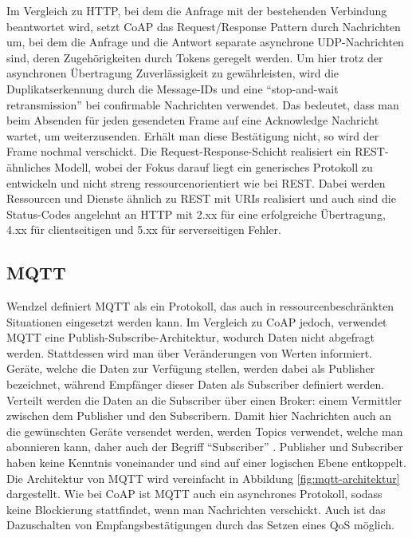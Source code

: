 \noindent Im Vergleich zu \ac{HTTP}, bei dem die Anfrage mit der bestehenden Verbindung beantwortet wird, setzt CoAP das Request/Response Pattern durch Nachrichten um, bei dem die Anfrage und die Antwort separate asynchrone UDP-Nachrichten sind, deren
Zugehörigkeiten durch Tokens geregelt werden. Um hier trotz der asynchronen Übertragung Zuverlässigkeit zu gewährleisten, wird die Duplikatserkennung durch die Message-IDs und eine 
``stop-and-wait retransmission'' bei confirmable Nachrichten verwendet. \cite{shelby_constrained_2014} Das bedeutet, dass man beim Absenden für jeden gesendeten Frame auf eine Acknowledge Nachricht wartet, um weiterzusenden. Erhält man diese
Bestätigung nicht, so wird der Frame nochmal verschickt. \cite{hasegawa_throughput_1995} Die Request-Response-Schicht realisiert ein \ac{REST}-ähnliches Modell, wobei der Fokus darauf liegt ein generisches Protokoll zu 
entwickeln und nicht streng ressourcenorientiert wie bei \ac{REST}. \cite{burke_restful_2013} Dabei werden Ressourcen und Dienste ähnlich zu \ac{REST} mit \acp{URI} realisiert und auch sind die Status-Codes angelehnt an \ac{HTTP} mit 2.xx für eine erfolgreiche Übertragung, 4.xx für clientseitigen und 5.xx für 
serverseitigen Fehler.

\subsection{MQTT}
\label{mqtt-definition}

Wendzel definiert \ac{MQTT} als ein Protokoll, das auch in ressourcenbeschränkten Situationen eingesetzt werden kann. Im Vergleich zu CoAP jedoch, verwendet MQTT eine Publish-Subscribe-Architektur, wodurch
Daten nicht abgefragt werden. Stattdessen wird man über Veränderungen von Werten informiert. \cite{wendzel_it-sicherheit_2018} Geräte, welche die Daten zur Verfügung stellen, werden dabei als Publisher bezeichnet, während Empfänger dieser 
Daten als Subscriber definiert werden. Verteilt werden die Daten an die Subscriber über einen Broker: einem Vermittler zwischen dem Publisher und den Subscribern. Damit hier Nachrichten auch an die gewünschten Geräte versendet werden, werden 
Topics verwendet, welche man abonnieren kann, daher auch der Begriff ``Subscriber'' \cite{brandes_mikrocontroller_2024}. Publisher und Subscriber haben keine Kenntnis voneinander und sind auf einer logischen Ebene entkoppelt. \cite{wendzel_it-sicherheit_2018} \cite{hunkeler_mqtt-s_2008} Die Architektur von MQTT wird vereinfacht in Abbildung \ref{fig:mqtt-architektur} dargestellt. 
Wie bei CoAP ist MQTT auch ein asynchrones Protokoll, sodass keine Blockierung stattfindet, wenn man Nachrichten verschickt. Auch ist das Dazuschalten von Empfangsbestätigungen durch das Setzen eines \ac{QoS} möglich.\cite{brandes_mikrocontroller_2024}


